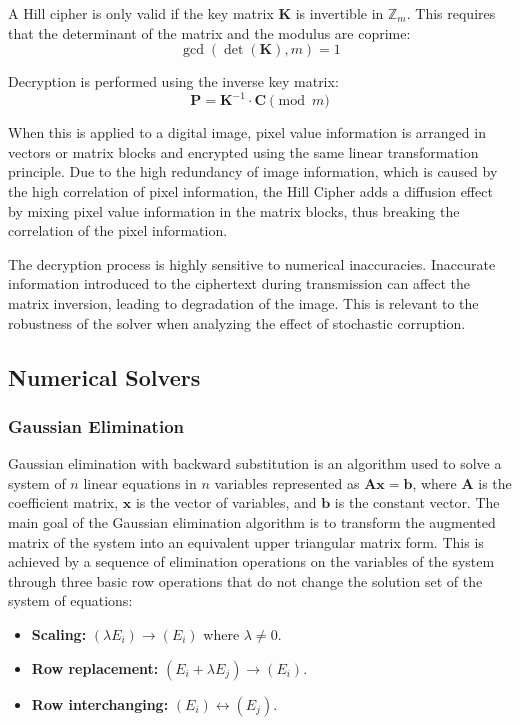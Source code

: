 \documentclass[11pt]{article}
\begin{document}
A Hill cipher is only valid if the key matrix $\mathbf{K}$ is invertible in $\mathbb{Z}_m$. This requires that the determinant of the matrix and the modulus are coprime:
$$ \gcd(\det(\mathbf{K}), m) = 1 $$

Decryption is performed using the inverse key matrix:
$$ \mathbf{P} = \mathbf{K}^{-1} \cdot \mathbf{C} \pmod{m} $$

When this is applied to a digital image, pixel value information is arranged in vectors or matrix blocks and encrypted using the same linear transformation principle. Due to the high redundancy of image information, which is caused by the high correlation of pixel information, the Hill Cipher adds a diffusion effect by mixing pixel value information in the matrix blocks, thus breaking the correlation of the pixel information. 

The decryption process is highly sensitive to numerical inaccuracies. Inaccurate information introduced to the ciphertext during transmission can affect the matrix inversion, leading to degradation of the image. This is relevant to the robustness of the solver when analyzing the effect of stochastic corruption.

\subsection{Numerical Solvers}

\subsubsection{Gaussian Elimination}
Gaussian elimination with backward substitution is an algorithm used to solve a system of $n$ linear equations in $n$ variables represented as $\mathbf{A}\mathbf{x}=\mathbf{b}$, where $\mathbf{A}$ is the coefficient matrix, $\mathbf{x}$ is the vector of variables, and $\mathbf{b}$ is the constant vector. The main goal of the Gaussian elimination algorithm is to transform the augmented matrix of the system into an equivalent upper triangular matrix form. This is achieved by a sequence of elimination operations on the variables of the system through three basic row operations that do not change the solution set of the system of equations:
\begin{itemize}
    \item \textbf{Scaling:} $(\lambda E_i) \rightarrow (E_i)$ where $\lambda \neq 0$.
    \item \textbf{Row replacement:} $(E_i + \lambda E_j) \rightarrow (E_i)$.
    \item \textbf{Row interchanging:} $(E_i) \leftrightarrow (E_j)$.
\end{itemize}
\end{document}
